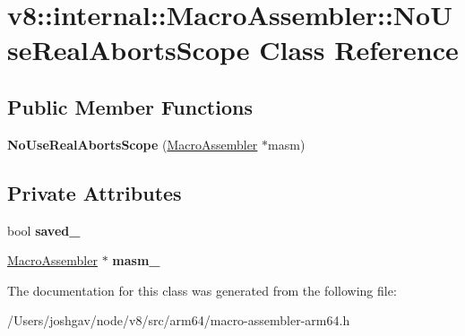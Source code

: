 \hypertarget{classv8_1_1internal_1_1_macro_assembler_1_1_no_use_real_aborts_scope}{}\section{v8\+:\+:internal\+:\+:Macro\+Assembler\+:\+:No\+Use\+Real\+Aborts\+Scope Class Reference}
\label{classv8_1_1internal_1_1_macro_assembler_1_1_no_use_real_aborts_scope}
\subsection*{Public Member Functions}
\begin{DoxyCompactItemize}
\item 
{\bfseries No\+Use\+Real\+Aborts\+Scope} (\hyperlink{classv8_1_1internal_1_1_macro_assembler}{Macro\+Assembler} $\ast$masm)\hypertarget{classv8_1_1internal_1_1_macro_assembler_1_1_no_use_real_aborts_scope_a66e12001abd95d69dd91615e28c2d778}{}\label{classv8_1_1internal_1_1_macro_assembler_1_1_no_use_real_aborts_scope_a66e12001abd95d69dd91615e28c2d778}

\end{DoxyCompactItemize}
\subsection*{Private Attributes}
\begin{DoxyCompactItemize}
\item 
bool {\bfseries saved\+\_\+}\hypertarget{classv8_1_1internal_1_1_macro_assembler_1_1_no_use_real_aborts_scope_add41f6465be43cd6477f4515f1390511}{}\label{classv8_1_1internal_1_1_macro_assembler_1_1_no_use_real_aborts_scope_add41f6465be43cd6477f4515f1390511}

\item 
\hyperlink{classv8_1_1internal_1_1_macro_assembler}{Macro\+Assembler} $\ast$ {\bfseries masm\+\_\+}\hypertarget{classv8_1_1internal_1_1_macro_assembler_1_1_no_use_real_aborts_scope_a13f2f7759cf8791204e090a52cf67d76}{}\label{classv8_1_1internal_1_1_macro_assembler_1_1_no_use_real_aborts_scope_a13f2f7759cf8791204e090a52cf67d76}

\end{DoxyCompactItemize}


The documentation for this class was generated from the following file\+:\begin{DoxyCompactItemize}
\item 
/\+Users/joshgav/node/v8/src/arm64/macro-\/assembler-\/arm64.\+h\end{DoxyCompactItemize}
